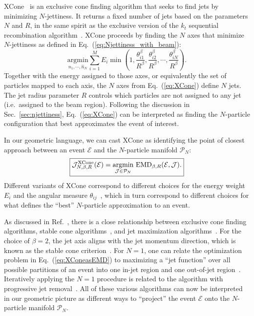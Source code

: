 \documentclass[letterpaper,11pt]{article}
\DeclareRobustCommand{\Sec}[1]{Sec.~\ref{#1}}
\DeclareRobustCommand{\Eq}[1]{Eq.~(\ref{#1})}
\DeclareRobustCommand{\Ref}[1]{Ref.~\cite{#1}}
\begin{document}
XCone~\cite{Stewart:2015waa,Thaler:2015xaa} is an exclusive cone finding algorithm that seeks to find jets by minimizing $N$-jettiness.
%
It returns a fixed number of jets based on the parameters $N$ and $R$, in the same spirit as the exclusive version of the $k_t$ sequential recombination algorithm~\cite{Catani:1993hr}.
%
XCone proceeds by finding the $N$ axes that minimize $N$-jettiness as defined in \Eq{eq:Njettiness_with_beam}:
%
\begin{equation}\label{eq:XCone}
\underset{\hat n_1,\cdots,\hat n_N}{\text{argmin}}\sum_{i=1}^M E_i \min\left(1, \frac{\theta_{i1}^\beta}{R^\beta}, \frac{\theta_{i2}^\beta}{R^\beta}, \cdots, \frac{\theta_{iN}^\beta}{R^\beta}\right).
\end{equation}
%
Together with the energy assigned to those axes, or equivalently the set of particles mapped to each axis, the $N$ axes from \Eq{eq:XCone} define $N$ jets.
%
The jet radius parameter $R$ controls which particles are not assigned to any jet (i.e.\ assigned to the beam region). 
%
Following the discussion in \Sec{sec:njettiness}, \Eq{eq:XCone} can be interpreted as finding the $N$-particle configuration that best approximates the event of interest.


In our geometric language, we can cast XCone as identifying the point of closest approach between an event $\mathcal E$ and the $N$-particle manifold $\mathcal{P}_N$:
%
\begin{equation}\label{eq:XConeasEMD}
\begin{boxed}{
\mathcal J^\text{XCone}_{N,\beta,R}(\mathcal E) = \underset{\mathcal J\in\mathcal P_N}{\text{argmin}}\,\,\text{EMD}_{\beta,R}(\mathcal E, \mathcal J).
}\end{boxed}
\end{equation}
%
Different variants of XCone correspond to different choices for the energy weight $E_i$ and the angular measure $\theta_{ij}$~\cite{Jouttenus:2013hs,Stewart:2015waa}, which in turn correspond to different choices for what defines the ``best'' $N$-particle approximation to an event.


As discussed in \Ref{Thaler:2015uja}, there is a close relationship between exclusive cone finding algorithms, stable cone algorithms~\cite{Blazey:2000qt,Ellis:2001aa,Salam:2007xv}, and jet maximization algorithms~\cite{Georgi:2014zwa,Ge:2014ova,Bai:2014qca,Bai:2015fka,Wei:2019rqy}.
%
For the choice of $\beta = 2$, the jet axis aligns with the jet momentum direction, which is known as the stable cone criterion~\cite{Blazey:2000qt,Ellis:2001aa}.
%
For $N = 1$, one can relate the optimization problem in \Eq{eq:XConeasEMD} to maximizing a ``jet function'' over all possible partitions of an event into one in-jet region and one out-of-jet region~\cite{Georgi:2014zwa}.
%
Iteratively applying the $N = 1$ procedure is related to the  algorithm with progressive jet removal~\cite{Salam:2007xv}.
%
All of these various algorithms can now be interpreted in our geometric picture as different ways to ``project'' the event $\mathcal E$ onto the $N$-particle manifold $\mathcal{P}_N$.
\end{document}
